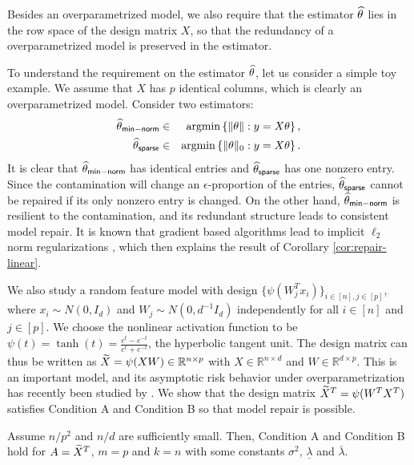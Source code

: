 Besides an overparametrized model, we also require that the estimator $\widehat{\theta}$ lies in the row space of the design matrix $X$, so that the redundancy of a overparametrized model is preserved in the estimator.
\begin{remark}
To understand the requirement on the estimator $\widehat{\theta}$, let us consider a simple toy example. We assume that $X$ has $p$ identical columns, which is clearly an overparametrized model. Consider two estimators:
\begin{eqnarray*}
\wh{\theta}_{\sf min-norm} &\in& \argmin\left\{\|\theta\|: y=X\theta\right\}, \\
\wh{\theta}_{\sf sparse} &\in& \argmin\left\{\|\theta\|_0: y=X\theta\right\}.
\end{eqnarray*}
It is clear that $\widehat{\theta}_{\sf min-norm}$ has identical entries and $\widehat{\theta}_{\sf sparse}$ has one nonzero entry. Since the contamination will change an $\epsilon$-proportion of the entries, $\widehat{\theta}_{\sf sparse}$ cannot be repaired if its only nonzero entry is changed. On the other hand, $\widehat{\theta}_{\sf min-norm}$ is resilient to the contamination, and its redundant structure leads to consistent model repair. It is known that gradient based algorithms lead to implicit $\ell_2$ norm regularizations \citep{neyshabur2014search}, which then explains the result of Corollary \ref{cor:repair-linear}.
\end{remark}


We also study a random feature model with design $\{\psi(W_j^Tx_i)\}_{i\in[n],j\in[p]}$, where $x_i\sim N(0,I_d)$ and $W_j\sim N(0,d^{-1}I_d)$ independently for all $i\in[n]$ and $j\in[p]$. We choose the nonlinear activation function to be $\psi(t)=\tanh(t)=\frac{e^t-e^{-t}}{e^t+e^{-t}}$, the hyperbolic tangent unit. The design matrix can thus be written as $\widetilde{X}=\psi(XW)\in\mathbb{R}^{n\times p}$ with $X\in\mathbb{R}^{n\times d}$ and $W\in\mathbb{R}^{d\times p}$. This is an important model, and its asymptotic risk behavior under overparametrization has recently been studied by \cite{mei2019generalization}. We show that the design matrix $\widetilde{X}^T=\psi(W^TX^T)$ satisfies Condition A and Condition B so that model repair is possible.

\begin{lemma}\label{lem:design-rf}
Assume $n/p^2$ and $n/d$ are sufficiently small. Then, Condition A and Condition B hold for $A=\widetilde{X}^T$, $m=p$ and $k=n$ with some constants  $\sigma^2$, $\underline{\lambda}$ and $\overline{\lambda}$.
\end{lemma}


